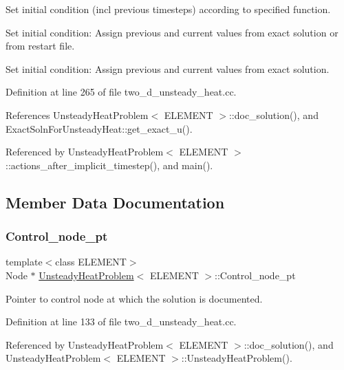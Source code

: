 Set initial condition (incl previous timesteps) according to specified function. 

Set initial condition\+: Assign previous and current values from exact solution or from restart file.

Set initial condition\+: Assign previous and current values from exact solution. 

Definition at line 265 of file two\+\_\+d\+\_\+unsteady\+\_\+heat.\+cc.



References Unsteady\+Heat\+Problem$<$ E\+L\+E\+M\+E\+N\+T $>$\+::doc\+\_\+solution(), and Exact\+Soln\+For\+Unsteady\+Heat\+::get\+\_\+exact\+\_\+u().



Referenced by Unsteady\+Heat\+Problem$<$ E\+L\+E\+M\+E\+N\+T $>$\+::actions\+\_\+after\+\_\+implicit\+\_\+timestep(), and main().



\subsection{Member Data Documentation}
\mbox{\label{classUnsteadyHeatProblem_ac0cf04bd0b915f02b171fd50cae13874}} 
\subsubsection{\texorpdfstring{Control\+\_\+node\+\_\+pt}{Control\_node\_pt}}
{\footnotesize\ttfamily template$<$class E\+L\+E\+M\+E\+NT$>$ \\
Node $\ast$ \hyperlink{classUnsteadyHeatProblem}{Unsteady\+Heat\+Problem}$<$ E\+L\+E\+M\+E\+NT $>$\+::Control\+\_\+node\+\_\+pt\hspace{0.3cm}{\ttfamily [private]}}



Pointer to control node at which the solution is documented. 



Definition at line 133 of file two\+\_\+d\+\_\+unsteady\+\_\+heat.\+cc.



Referenced by Unsteady\+Heat\+Problem$<$ E\+L\+E\+M\+E\+N\+T $>$\+::doc\+\_\+solution(), and Unsteady\+Heat\+Problem$<$ E\+L\+E\+M\+E\+N\+T $>$\+::\+Unsteady\+Heat\+Problem().

